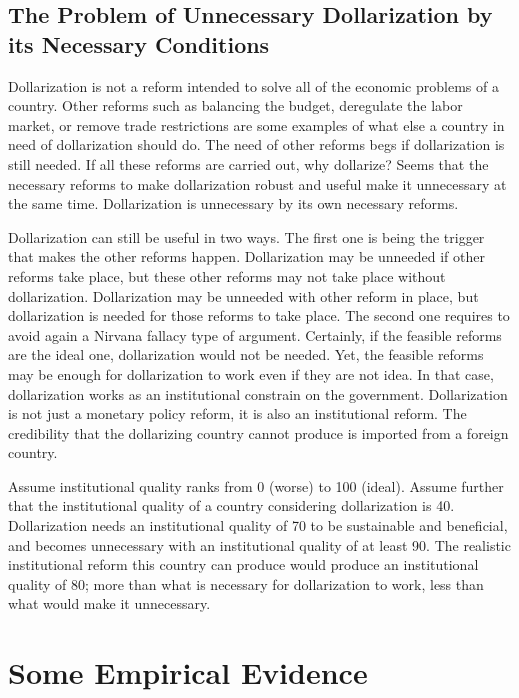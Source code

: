 \documentclass[12pt]{article}
\begin{document}
\subsection{The Problem of Unnecessary Dollarization by its Necessary Conditions}

Dollarization is not a reform intended to solve all of the economic problems of a country. Other reforms such as balancing the budget, deregulate the labor market, or remove trade restrictions are some examples of what else a country in need of dollarization should do. The need of other reforms begs if dollarization is still needed. If all these reforms are carried out, why dollarize? Seems that the necessary reforms to make dollarization robust and useful make it unnecessary at the same time. Dollarization is unnecessary by its own necessary reforms.

Dollarization can still be useful in two ways. The first one is being the trigger that makes the other reforms happen. Dollarization may be unneeded if other reforms take place, but these other reforms may not take place without dollarization. Dollarization may be unneeded with other reform in place, but dollarization is needed for those reforms to take place. The second one requires to avoid again a Nirvana fallacy type of argument. Certainly, if the feasible reforms are the ideal one, dollarization would not be needed. Yet, the feasible reforms may be enough for dollarization to work even if they are not idea. In that case, dollarization works as an institutional constrain on the government. Dollarization is not just a monetary policy reform, it is also an institutional reform. The credibility that the dollarizing country cannot produce is imported from a foreign country. 

Assume institutional quality ranks from 0 (worse) to 100 (ideal). Assume further that the institutional quality of a country considering dollarization is 40. Dollarization needs an institutional quality of 70 to be sustainable and beneficial, and becomes unnecessary with an institutional quality of at least 90. The realistic institutional reform this country can produce would produce an institutional quality of 80; more than what is necessary for dollarization to work, less than what would make it unnecessary.

\section{Some Empirical Evidence}
\end{document}
